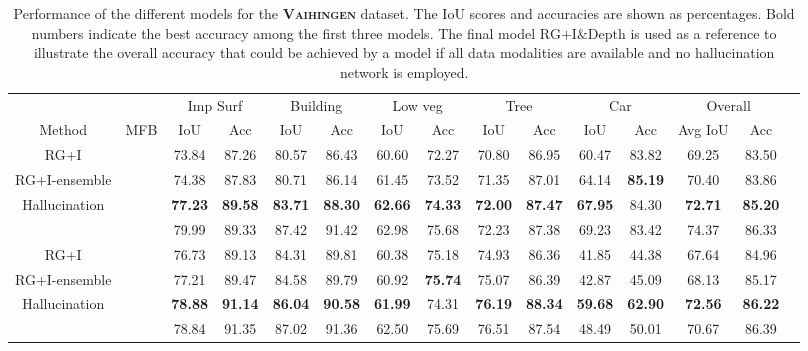 \documentclass[journal]{IEEEtran}
\newcommand{\cmark}{\ding{51}}%
\newcommand{\xmark}{\ding{55}}%
\begin{document}
\begin{table*}[t]
\begin{center}
\begin{tabular}{lc|c|c|c|c|c|c|c|c|c|c|c|c|c|}
\cline{3-14}
 & & \multicolumn{2}{|c|}{Imp Surf} & \multicolumn{2}{c|}{Building} & \multicolumn{2}{c|}{Low veg} & \multicolumn{2}{c|}{Tree} & \multicolumn{2}{c|}{Car} & \multicolumn{2}{c|}{Overall}\\
\cline{1-14}
\multicolumn{1}{|c|}{Method} & \multicolumn{1}{|c|}{MFB} & IoU & Acc & IoU & Acc & IoU & Acc & IoU & Acc & IoU & Acc & Avg IoU & Acc\\
\cline{1-14} 
\multicolumn{1}{|c|}{RG+I} & \cmark & 73.84 & 87.26 & 80.57 & 86.43 & 60.60 & 72.27 & 70.80 & 86.95 & 60.47 & 83.82 & 69.25 & 83.50\\
\cline{2-14}
\multicolumn{1}{|c|}{RG+I-ensemble} & \cmark & 74.38 & 87.83 & 80.71 & 86.14 & 61.45 & 73.52 & 71.35 & 87.01 & 64.14 & {\bf85.19} & 70.40 & 83.86 \\
\cline{2-14}
\multicolumn{1}{|c|}{Hallucination} & \cmark & {\bf77.23} & {\bf89.58} & {\bf83.71} & {\bf88.30} & {\bf62.66} & {\bf74.33} & {\bf72.00} & {\bf87.47} & {\bf67.95} & 84.30 & {\bf72.71} & {\bf85.20} \\
\hdashline
\multicolumn{1}{|c|}{RG+I\&Depth} & \cmark & 79.99 & 89.33 & 87.42 & 91.42 & 62.98 & 75.68 & 72.23 & 87.38 & 69.23 & 83.42 & 74.37 & 86.33 \\
\hline
\hline
\multicolumn{1}{|c|}{RG+I} & \xmark & 76.73 & 89.13 & 84.31 & 89.81 & 60.38 & 75.18 & 74.93 & 86.36 & 41.85 & 44.38 & 67.64 & 84.96\\
\hline
\multicolumn{1}{|c|}{RG+I-ensemble} & \xmark & 77.21 & 89.47 & 84.58 & 89.79 & 60.92 & {\bf75.74} & 75.07 & 86.39 & 42.87 & 45.09 & 68.13 & 85.17 \\
\hline
\multicolumn{1}{|c|}{Hallucination} & \xmark & {\bf78.88} & {\bf91.14} & {\bf86.04} & {\bf90.58} & {\bf61.99} & 74.31 & {\bf76.19} & {\bf88.34} & {\bf59.68} & {\bf62.90} & {\bf72.56} & {\bf86.22}\\
\hdashline
\multicolumn{1}{|c|}{RG+I\&Depth} & \xmark & 78.84 & 91.35 & 87.02 & 91.36 & 62.50 & 75.69 & 76.51 & 87.54 & 48.49 & 50.01 & 70.67 & 86.39\\
\hline
\end{tabular}
\vspace{0.2cm}
\caption{Performance of the different models for the {\bf\scshape Vaihingen} dataset. The IoU scores and accuracies are shown as percentages. Bold numbers indicate the best accuracy among the first three models. The final model $\text{RG+I\&Depth}$ is used as a reference to illustrate the overall accuracy that could be achieved by a model if all data modalities are available and no hallucination network is employed.}
\label{tab:resultsMFBVaihingenIOU}
\end{center}
\end{table*}
\end{document}
